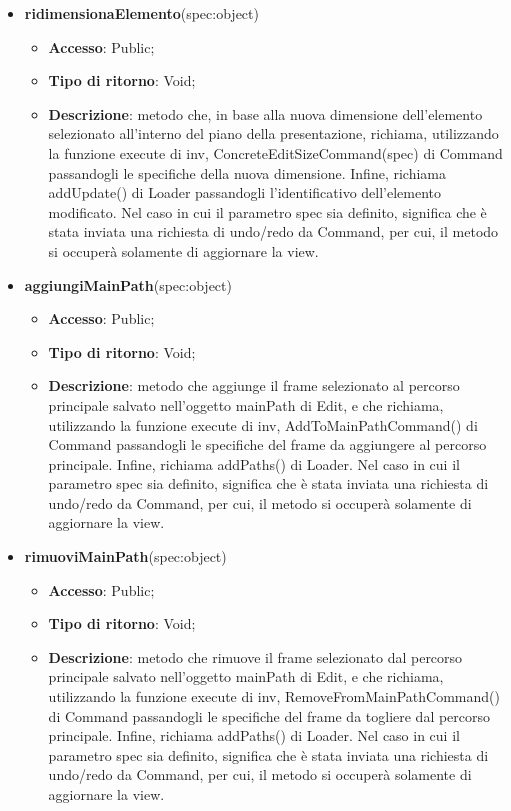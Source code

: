 {{\begin{itemize}
\begin{itemize}
			\end{itemize}
			\item \textbf{ridimensionaElemento}(spec:object)
			\begin{itemize}
				\item \textbf{Accesso}: Public;
				\item \textbf{Tipo di ritorno}: Void;
				\item \textbf{Descrizione}: metodo che, in base alla nuova dimensione dell'elemento selezionato all'interno del piano della presentazione, richiama, utilizzando la funzione execute di inv, ConcreteEditSizeCommand(spec) di Command passandogli le specifiche della nuova dimensione. Infine, richiama addUpdate() di Loader passandogli l'identificativo dell'elemento modificato. Nel caso in cui il parametro spec sia definito, significa che è stata inviata una richiesta di undo/redo da Command, per cui, il metodo si occuperà solamente di aggiornare la view.
			\end{itemize}
			\item \textbf{aggiungiMainPath}(spec:object)
			\begin{itemize}
				\item \textbf{Accesso}: Public;
				\item \textbf{Tipo di ritorno}: Void;
				\item \textbf{Descrizione}: metodo che aggiunge il frame selezionato al percorso principale salvato nell'oggetto mainPath di Edit, e che richiama, utilizzando la funzione execute di inv, AddToMainPathCommand() di Command passandogli le specifiche del frame da aggiungere al percorso principale. Infine, richiama addPaths() di Loader. Nel caso in cui il parametro spec sia definito, significa che è stata inviata una richiesta di undo/redo da Command, per cui, il metodo si occuperà solamente di aggiornare la view.
			\end{itemize}
			\item \textbf{rimuoviMainPath}(spec:object)
			\begin{itemize}
				\item \textbf{Accesso}: Public;
				\item \textbf{Tipo di ritorno}: Void;
				\item \textbf{Descrizione}: metodo che rimuove il frame selezionato dal percorso principale salvato nell'oggetto mainPath di Edit, e che richiama, utilizzando la funzione execute di inv, RemoveFromMainPathCommand() di Command passandogli le specifiche del frame da togliere dal percorso principale. Infine, richiama addPaths() di Loader. Nel caso in cui il parametro spec sia definito, significa che è stata inviata una richiesta di undo/redo da Command, per cui, il metodo si occuperà solamente di aggiornare la view.

\end{itemize}
\end{itemize}}}
